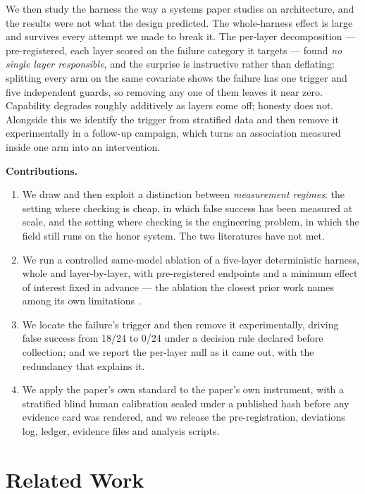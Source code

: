 \documentclass[11pt]{article}
\begin{document}
We then study the harness the way a systems paper studies an
architecture, and the results were not what the design predicted. The
whole-harness effect is large and survives every attempt we made to
break it. The per-layer decomposition --- pre-registered, each layer
scored on the failure category it targets --- found \emph{no single layer
responsible}, and the surprise is instructive rather than deflating:
splitting every arm on the same covariate shows the failure has one
trigger and five independent guards, so removing any one of them leaves
it near zero. Capability degrades roughly additively as layers come off;
honesty does not. Alongside this we identify the trigger from stratified
data and then remove it experimentally in a follow-up campaign, which
turns an association measured inside one arm into an intervention.

\medskip
\noindent\textbf{Contributions.}
\begin{enumerate}[label=\textbf{C\arabic*.},leftmargin=2.6em,itemsep=.25em]
\item We draw and then exploit a distinction between \emph{measurement
  regimes}: the setting where checking is cheap, in which false success
  has been measured at scale, and the setting where checking is the
  engineering problem, in which the field still runs on the honor
  system. The two literatures have not met.
\item We run a controlled same-model ablation of a five-layer
  deterministic harness, whole and layer-by-layer, with pre-registered
  endpoints and a minimum effect of interest fixed in advance --- the
  ablation the closest prior work names among its own limitations
  \citep{leni}.
\item We locate the failure's trigger and then remove it
  experimentally, driving false success from 18/24 to 0/24 under a
  decision rule declared before collection; and we report the per-layer
  null as it came out, with the redundancy that explains it.
\item We apply the paper's own standard to the paper's own instrument,
  with a stratified blind human calibration sealed under a published
  hash before any evidence card was rendered, and we release the
  pre-registration, deviations log, ledger, evidence files and analysis
  scripts.
\end{enumerate}

\section{Related Work}
\label{sec:related}
\end{document}
